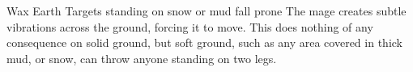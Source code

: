   {}%
  {Wax}%
  {Earth}%
  {}%
  {Targets standing on snow or mud fall prone}%
  {The mage creates subtle vibrations across the ground, forcing it to move.
    This does nothing of any consequence on solid ground, but soft ground, such as any area covered in thick mud, or snow, can throw anyone standing on two legs.}

